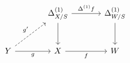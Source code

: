 \[
\begin{tikzcd}[column sep=large,row sep=large]
  &
  \Delta^{(1)}_{X/S}
    \arrow[r,"\Delta^{(1)}f"]
    \arrow[d]
  &
  \Delta^{(1)}_{W/S}
    \arrow[d]
  \\
  Y
    \arrow[r,"g"']
    \arrow[ur,dashed,"g'"]
  &
  X
    \arrow[r,"f"']
  &
  W
\end{tikzcd}
\]
